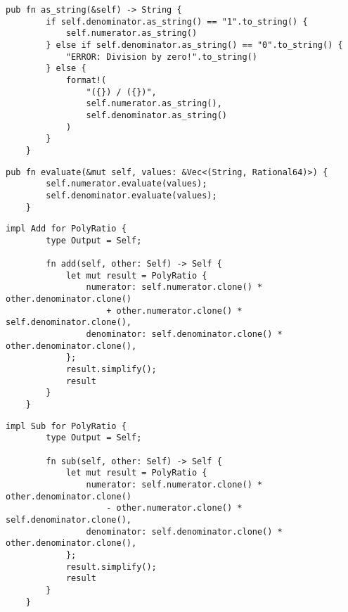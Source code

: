 \begin{lstlisting}[caption={The implementation of the \texttt{as\_string()} method for the \texttt{PolyRatio} struct}, label={lst:polyratio-as-string}]
    pub fn as_string(&self) -> String {
        if self.denominator.as_string() == "1".to_string() {
            self.numerator.as_string()
        } else if self.denominator.as_string() == "0".to_string() {
            "ERROR: Division by zero!".to_string()
        } else {
            format!(
                "({}) / ({})",
                self.numerator.as_string(),
                self.denominator.as_string()
            )
        }
    }
\end{lstlisting}

\begin{lstlisting}[caption={The implementation of the \texttt{evaluate()} method for the \texttt{PolyRatio} struct}, label={lst:polyratio-evaluate}]
    pub fn evaluate(&mut self, values: &Vec<(String, Rational64)>) {
        self.numerator.evaluate(values);
        self.denominator.evaluate(values);
    }
\end{lstlisting}

\begin{lstlisting}[caption={The implementation of the addition operation for the \texttt{PolyRatio} struct}, label={lst:polyratio-add}]
    impl Add for PolyRatio {
        type Output = Self;
    
        fn add(self, other: Self) -> Self {
            let mut result = PolyRatio {
                numerator: self.numerator.clone() * other.denominator.clone()
                    + other.numerator.clone() * self.denominator.clone(),
                denominator: self.denominator.clone() * other.denominator.clone(),
            };
            result.simplify();
            result
        }
    }
\end{lstlisting}

\begin{lstlisting}[caption={The implementation of the subtraction operation for the \texttt{PolyRatio} struct}, label={lst:polyratio-sub}]
    impl Sub for PolyRatio {
        type Output = Self;
    
        fn sub(self, other: Self) -> Self {
            let mut result = PolyRatio {
                numerator: self.numerator.clone() * other.denominator.clone()
                    - other.numerator.clone() * self.denominator.clone(),
                denominator: self.denominator.clone() * other.denominator.clone(),
            };
            result.simplify();
            result
        }
    }
\end{lstlisting}

